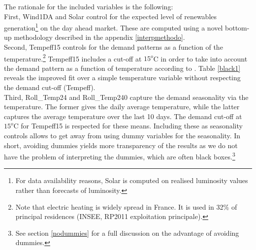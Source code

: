 The rationale for the included variables is the following: \\

First, Wind1DA and Solar control for the expected level of renewables generation\footnote{For data availability reasons, Solar is computed on realised luminosity values rather than forecasts of luminosity.} on the day ahead market. These are computed using a novel bottom-up methodology described in the appendix \ref{interpmethodo}. \\

Second, Tempeff15 controls for the demand patterns as a function of the temperature.\footnote{Note that electric heating is widely spread in France. It is used in 32\% of principal residences (INSEE, RP2011 exploitation principale).} 
Tempeff15 includes a cut-off at $15^o$C in order to take into account the demand pattern as a function of temperature according to \cite{rtewebsite1}. Table \ref{black1} reveals the improved fit over a simple temperature variable without respecting the demand cut-off (Tempeff). \\

Third, Roll\_Temp24 and Roll\_Temp240 capture the demand seasonality via the temperature. The former gives the daily average temperature, while the latter captures the average temperature over the last 10 days. The demand cut-off at $15^o$C for Tempeff15 is respected for these means.  Including these as seasonality controls allows to get away from using dummy variables for the seasonality. In short, avoiding dummies yields more transparency of the results as we do not have the problem of interpreting the dummies, which are often black boxes.\footnote{See section \ref{nodummies} for a full discussion on the advantage of avoiding dummies.} \\

